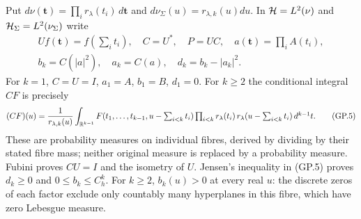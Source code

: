 Put $d\nu(\mathbf t)=\prod_i r_\lambda(t_i)\,d\mathbf t$ and
$d\nu_\Sigma(u)=r_{\lambda,k}(u)du$. In
$\mathcal H=L^2(\nu)$ and $\mathcal H_\Sigma=L^2(\nu_\Sigma)$ write
\begin{equation}
 \begin{gathered}
 Uf(\mathbf t)=f(\textstyle\sum_i t_i),\quad C=U^*,\quad P=UC,
 \quad a(\mathbf t)=\prod_i A(t_i),\\
 b_k=C(|a|^2),\quad a_k=C(a),\quad d_k=b_k-|a_k|^2.
 \end{gathered}
 \tag{GP.4}
\end{equation}
For $k=1$, $C=U=I$, $a_1=A$, $b_1=B$, $d_1=0$. For $k\geq2$
the conditional integral $CF$ is precisely
\begin{equation}
 (CF)(u)=\frac{1}{r_{\lambda,k}(u)}
 \int_{\mathbb R^{k-1}}F(t_1,\ldots,t_{k-1},u-\textstyle\sum_{i<k}t_i)
 \prod_{i<k}r_\lambda(t_i)\,r_\lambda(u-\textstyle\sum_{i<k}t_i)
 \,d^{k-1}t.
 \tag{GP.5}
\end{equation}
These are probability measures on individual fibres, derived by dividing
by their stated fibre mass; neither original measure is replaced by a
probability measure. Fubini proves $CU=I$ and the isometry of $U$.
Jensen's inequality in (GP.5) proves $d_k\geq0$ and
$0\leq b_k\leq C_h^k$. For $k\geq2$, $b_k(u)>0$ at every real $u$:
the discrete zeros of each factor exclude only countably many
hyperplanes in this fibre, which have zero Lebesgue measure.

